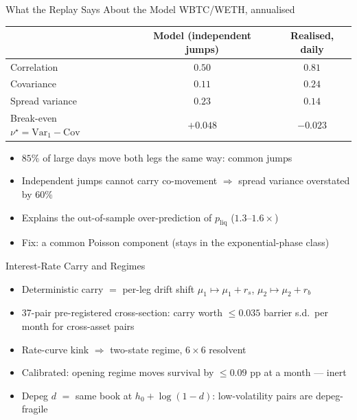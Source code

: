 \documentclass[aspectratio=169,10pt]{beamer}
\newcommand{\liq}{p_{\mathrm{liq}}}
\begin{document}
\begin{frame}{What the Replay Says About the Model}
  \small
  WBTC/WETH, annualised
  \vspace{0.2em}

  \begin{center}
  \begin{tabular}{lcc}
  \toprule
  & Model (independent jumps) & Realised, daily \\
  \midrule
  Correlation & $0.50$ & $0.81$ \\
  Covariance & $0.11$ & $0.24$ \\
  Spread variance & $0.23$ & $0.14$ \\
  Break-even $\nu^\star=\mathrm{Var}_1-\mathrm{Cov}$ & $+0.048$ & $-0.023$ \\
  \bottomrule
  \end{tabular}
  \end{center}
  \begin{itemize}
    \item $85\%$ of large days move both legs the same way: \alert{common jumps}
    \item Independent jumps cannot carry co-movement $\Rightarrow$ spread variance overstated by $60\%$
    \item Explains the out-of-sample over-prediction of $\liq$ ($1.3$--$1.6\times$)
    \item Fix: a common Poisson component (stays in the exponential-phase class)
  \end{itemize}
\end{frame}

\begin{frame}{Interest-Rate Carry and Regimes}
  \small
  \begin{itemize}
    \item Deterministic carry $=$ per-leg drift shift $\mu_1\mapsto\mu_1+r_s$, $\mu_2\mapsto\mu_2+r_b$
    \item 37-pair pre-registered cross-section: carry worth $\le0.035$ barrier s.d.\ per month for cross-asset pairs
    \item Rate-curve kink $\Rightarrow$ two-state regime, $6\times6$ resolvent
    \item Calibrated: opening regime moves survival by $\le0.09$ pp at a month --- inert
    \item Depeg $d$ $=$ same book at $h_0+\log(1-d)$: low-volatility pairs are depeg-fragile
  \end{itemize}
\end{frame}
\end{document}
